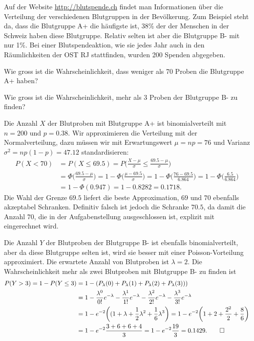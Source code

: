 Auf der Website \url{http://blutspende.ch} findet man Informationen
über die Verteilung der verschiedenen Blutgruppen in der
Bevölkerung.
Zum Beispiel steht da, dass die Blutgruppe A+ die häufigste ist, 38\%
der der Menschen in der Schweiz haben diese Blutgruppe.
Relativ selten ist aber die Blutgruppe B- mit nur 1\%.
Bei einer Blutspendeaktion, wie sie jedes Jahr auch in den Räumlichkeiten
der OST RJ stattfinden, wurden 200 Spenden abgegeben.
\begin{teilaufgaben}
\item
Wie gross ist die Wahrscheinlichkeit, dass weniger als 70 Proben die
Blutgruppe A+ haben?
\item
Wie gross ist die Wahrscheinlichkeit, mehr als 3 Proben der Blutgruppe B-
zu finden?
\end{teilaufgaben}

\begin{loesung}
\begin{teilaufgaben}
\item
Die Anzahl $X$ der Blutproben mit Blutgruppe A+ ist binomialverteilt mit
$n=200$ und $p=0.38$.
Wir approximieren die Verteilung mit der Normalverteilung, dazu müssen
wir mit Erwartungswert $\mu=np=76$ und Varianz $\sigma^2=np(1-p)=47.12$
standardisieren:
\begin{align*}
P(X<70)
&=
P(X\le 69.5)
=
P\biggl(
\frac{X-\mu}{\sigma} \le \frac{69.5-\mu}{\sigma}
\biggr)
\\
&=
\Phi\biggl(
\frac{69.5-\mu}{\sigma}
\biggr)
=
1-\Phi\biggl(
\frac{\mu-69.5}{\sigma}
\biggr)
=
1-\Phi\biggl(
\frac{76-69.5}{6.864}
\bigr)
=
1-\Phi\biggl(
\frac{6.5}{6.864}
\biggr)
\\
&=
1-\Phi(0.947)
=
1-0.8282
=
0.1718.
\end{align*}
Die Wahl der Grenze $69.5$ liefert die beste Approximation, $69$ und $70$
ebenfalls akzeptabel Schranken.
Definitiv falsch ist jedoch die Schranke $70.5$, da damit die Anzahl $70$,
die in der Aufgabenstellung ausgeschlossen ist, explizit mit eingerechnet
wird.
\item
Die Anzahl $Y$ der Blutproben der Blutgruppe B- ist ebenfalls binomialverteilt,
aber da diese Blutgruppe selten ist, wird sie besser mit einer
Poisson-Vorteilung approximiert.
Die erwartete Anzahl von Blutproben ist $\lambda=2$.
Die Wahrscheinlichkeit mehr als zwei Blutproben mit Blutgruppe B-
zu finden ist
\begin{align*}
P(Y>3)
=
1-P(Y\le 3)
&=
1-(
P_{\lambda}(0)
+
P_{\lambda}(1)
+
P_{\lambda}(2)
+
P_{\lambda}(3)
)
)
\\
&=
1
-
\frac{\lambda^0}{0!}e^{-\lambda}
-
\frac{\lambda^1}{1!}e^{-\lambda}
-
\frac{\lambda^2}{2!}e^{-\lambda}
-
\frac{\lambda^3}{3!}e^{-\lambda}
\\
&=
1-e^{-2}\biggl((1+\lambda+\frac12\lambda^2+\frac16\lambda^3\biggr)
=
1-e^{-2}\biggl(1+2+\frac{2^2}{2}+\frac{8}{6}\biggr)
\\
&=
1-e^{-2}\frac{3+6+6+4}{3}
=
1-e^{-2}\frac{19}{3}
=
0.1429.
\qedhere
\end{align*}
\end{teilaufgaben}
\end{loesung}

